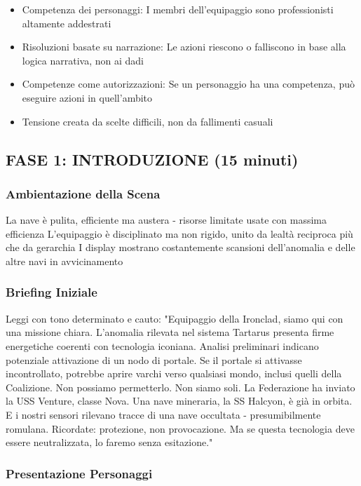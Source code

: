 \documentclass[letterpaper,twocolumn,openany,nodeprecatedcode]{dndbook}
\begin{document}
\begin{itemize}
    \item Competenza dei personaggi: I membri dell'equipaggio sono professionisti altamente addestrati
    \item Risoluzioni basate su narrazione: Le azioni riescono o falliscono in base alla logica narrativa, non ai dadi
    \item Competenze come autorizzazioni: Se un personaggio ha una competenza, può eseguire azioni in quell'ambito
    \item Tensione creata da scelte difficili, non da fallimenti casuali
\end{itemize}

\subsection{FASE 1: INTRODUZIONE (15 minuti)}
\subsubsection{Ambientazione della Scena}

La nave è pulita, efficiente ma austera - risorse limitate usate con massima efficienza
L'equipaggio è disciplinato ma non rigido, unito da lealtà reciproca più che da gerarchia
I display mostrano costantemente scansioni dell'anomalia e delle altre navi in avvicinamento

\subsubsection{Briefing Iniziale}
Leggi con tono determinato e cauto:
"Equipaggio della Ironclad, siamo qui con una missione chiara. L'anomalia rilevata nel sistema Tartarus presenta firme energetiche coerenti con tecnologia iconiana. Analisi preliminari indicano potenziale attivazione di un nodo di portale. Se il portale si attivasse incontrollato, potrebbe aprire varchi verso qualsiasi mondo, inclusi quelli della Coalizione. Non possiamo permetterlo. Non siamo soli. La Federazione ha inviato la USS Venture, classe Nova. Una nave mineraria, la SS Halcyon, è già in orbita. E i nostri sensori rilevano tracce di una nave occultata - presumibilmente romulana. Ricordate: protezione, non provocazione. Ma se questa tecnologia deve essere neutralizzata, lo faremo senza esitazione."
\subsubsection{Presentazione Personaggi}
\end{document}

